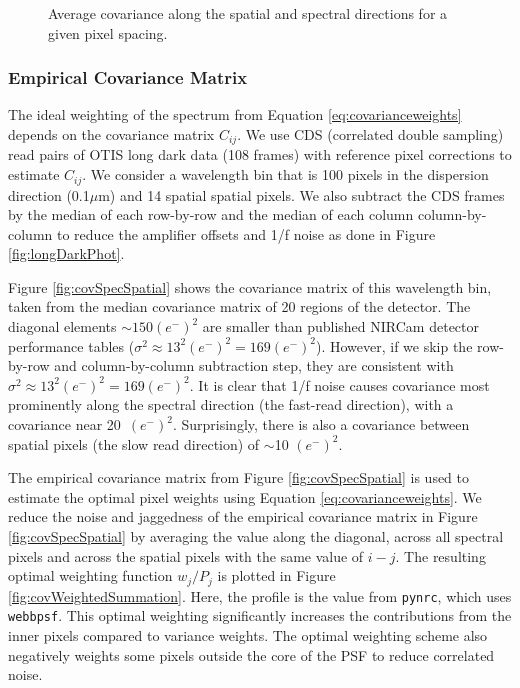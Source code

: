 \documentclass{aastex62}
\begin{document}
\begin{figure}[!hbtp]
\centering
\caption{Average covariance along the spatial and spectral directions for a given pixel spacing.}\label{fig:covSpecSpatialDiff}
\end{figure}

\subsubsection{Empirical Covariance Matrix}\label{sec:empCovarianceMatrix}
The ideal weighting of the spectrum from Equation \ref{eq:covarianceweights} depends on the covariance matrix $C_{ij}$.
We use CDS (correlated double sampling) read pairs of OTIS long dark data (108 frames) with reference pixel corrections to estimate $C_{ij}$.
We consider a wavelength bin that is 100 pixels in the dispersion direction (0.1$\mu$m) and 14 spatial spatial pixels.
We also subtract the CDS frames by the median of each row-by-row and the median of each column column-by-column to reduce the amplifier offsets and 1/f noise as done in Figure \ref{fig:longDarkPhot}.


Figure \ref{fig:covSpecSpatial} shows the covariance matrix of this wavelength bin, taken from the median covariance matrix of 20 regions of the detector.
The diagonal elements $\sim 150 (e^-)^2$ are smaller than published NIRCam detector performance tables ($\sigma^2 \approx 13^2 (e^-)^2=169 (e^-)^2$).
However, if we skip the row-by-row and column-by-column subtraction step, they are consistent with $\sigma^2 \approx 13^2 (e^-)^2=169 (e^-)^2$.
It is clear that 1/f noise causes covariance most prominently along the spectral direction (the fast-read direction), with a covariance near 20~$(e^-)^2$.
Surprisingly, there is also a covariance between spatial pixels (the slow read direction) of $\sim$10 $(e^-)^2$.




The empirical covariance matrix from Figure \ref{fig:covSpecSpatial} is used to estimate the optimal pixel weights using Equation \ref{eq:covarianceweights}.
We reduce the noise and jaggedness of the empirical covariance matrix in Figure \ref{fig:covSpecSpatial} by averaging the value along the diagonal, across all spectral pixels and across the spatial pixels with the same value of $i -j$.
The resulting optimal weighting function $w_j/P_j$ is plotted in Figure \ref{fig:covWeightedSummation}.
Here, the profile is the value from \texttt{pynrc}, which uses \texttt{webbpsf}.
This optimal weighting significantly increases the contributions from the inner pixels compared to variance weights.
The optimal weighting scheme also negatively weights some pixels outside the core of the PSF to reduce correlated noise.
\end{document}
